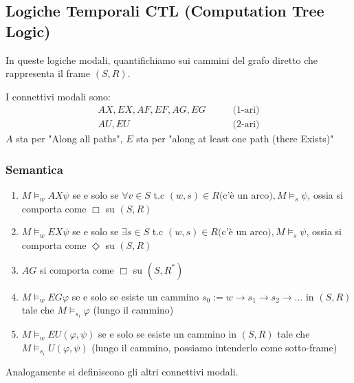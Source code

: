 \documentclass[../main.tex]{subfiles}
\begin{document}
\newpage

\subsection{Logiche Temporali CTL (Computation Tree Logic)}
In queste logiche modali, quantifichiamo sui cammini del grafo diretto che rappresenta il frame $(S,R)$.

I connettivi modali sono:
\begin{align*}
    AX, EX, AF, EF, AG, EG \qquad & \text{(1-ari)} \\
    AU, EU \qquad                 & \text{(2-ari)}
\end{align*}
$A$ sta per "Along all paths", $E$ sta per "along at least one path (there Exists)"
\subsubsection{Semantica}
\begin{enumerate}[label=\arabic*)]
    \item $M \vDash_w AX \psi $ se e solo se $\forall v \in S$ t.c $(w,s) \in R \text{(c'è un arco)} , M \vDash_s \psi$, ossia si comporta come $\Box$ su $(S,R)$
    \item $M \vDash_w EX \psi $ se e solo se $\exists s \in S$ t.c $(w,s) \in R \text{(c'è un arco)} , M \vDash_s \psi$, ossia si comporta come $\Diamond$ su $(S,R)$
    \item $AG$ si comporta come $\Box$ su $(S,R^*)$
    \item $M \vDash_w EG \varphi$ se e solo se esiste un cammino $s_0 := w \to s_1 \to s_2 \to \ldots $ in $(S,R)$ tale che $M \vDash_{s_i} \varphi$ (lungo il cammino)
    \item $M \vDash_w EU (\varphi, \psi)$ se e solo se esiste un cammino in $(S,R)$ tale che $M \vDash_{s_i} U(\varphi, \psi)$ (lungo il cammino, possiamo intenderlo come sotto-frame)
\end{enumerate}
Analogamente si definiscono gli altri connettivi modali.
\end{document}
